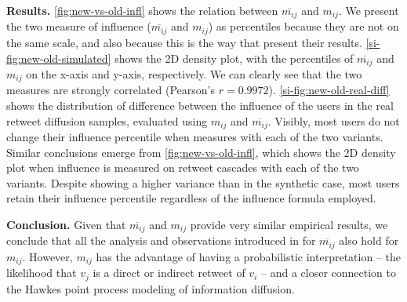 \textbf{Results.}
\cref{fig:new-vs-old-infl} shows the relation between $\overline{m_{ij}}$ and $m_{ij}$.
We present the two measure of influence ($\overline{m_{ij}}$ and $m_{ij}$) as percentiles because they are not on the same scale, and also because this is the way that \citet{Rizoiu2018a} present their results.
\cref{si-fig:new-old-simulated} shows the 2D density plot, with  the percentiles of $\overline{m_{ij}}$ and $m_{ij}$ on the x-axis and y-axis, respectively.
We can clearly see that the two measures are strongly correlated (Pearson's $r = 0.9972$).
\cref{si-fig:new-old-real-diff} shows the distribution of difference between the influence of the users in the real retweet diffusion samples, evaluated using $m_{ij}$ and $\overline{m_{ij}}$.
Visibly, most users do not change their influence percentile when measures with each of the two variants.
Similar conclusions emerge from \cref{fig:new-vs-old-infl}, which shows the 2D density plot when influence is measured on retweet cascades with each of the two variants.
Despite showing a higher variance than in the synthetic case, most users retain their influence percentile regardless of the influence formula employed.

\textbf{Conclusion.}
Given that $\overline{m_{ij}}$ and $m_{ij}$ provide very similar empirical results, we conclude that all the analysis and observations introduced in \citep{Rizoiu2018a} for $\overline{m_{ij}}$ also hold for $m_{ij}$.
However, $m_{ij}$ has the advantage of having a probabilistic interpretation -- the likelihood that $v_j$ is a direct or indirect retweet of $v_i$ -- and a closer connection to the Hawkes point process modeling of information diffusion.
